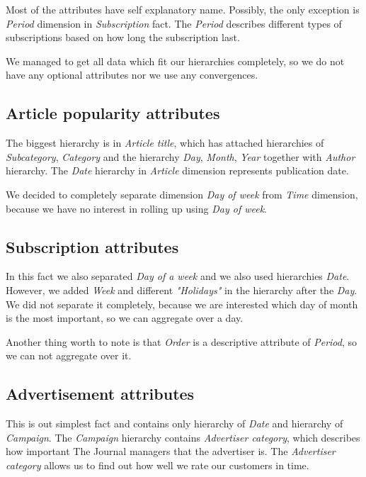 Most of the attributes have self explanatory name.
Possibly, the only exception is {\it Period} dimension in {\it Subscription} fact. The {\it Period} describes different types of subscriptions based on how long the subscription last. 

We managed to get all data which fit our hierarchies completely, so we do not have any optional attributes nor we use any convergences. 

\subsection*{Article popularity attributes} 
The biggest hierarchy is in {\it Article title}, which has attached hierarchies of {\it Subcategory}, {\it Category} and the hierarchy {\it Day}, {\it Month}, {\it Year} together with {\it Author} hierarchy. The {\it Date} hierarchy in {\it Article} dimension represents publication date.

We decided to completely separate dimension {\it Day of week} from {\it Time} dimension, because we have no interest in rolling up using {\it Day of week}.

\subsection*{Subscription attributes}
In this fact we also separated {\it Day of a week} and we also used hierarchies {\it Date}. However, we added {\it Week} and different {\it "Holidays"} in the hierarchy after the {\it Day}. We did not separate it completely, because we are interested which day of month is the most important, so we can aggregate over a day.

Another thing worth to note is that {\it Order} is a descriptive attribute of {\it Period}, so we can not aggregate over it.

\subsection*{Advertisement attributes} 
This is out simplest fact and contains only hierarchy of {\it Date} and hierarchy of {\it Campaign}.
The {\it Campaign} hierarchy contains {\it Advertiser category}, which describes how important The Journal managers that the advertiser is. The {\it Advertiser category} allows us to find out how well we rate our customers in time.
